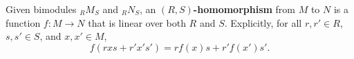 Given bimodules ${}_R M_S$ and ${}_R N_S$, an \textbf{$(R,S)$-homomorphism} from $M$ to $N$ is a function $f: M \to N$ that is linear over both $R$ and $S$. Explicitly, for all $r, r' \in R$, $s, s' \in S$, and $x, x' \in M$,
$$f(rxs + r'x's') = rf(x)s + r'f(x')s'.$$
